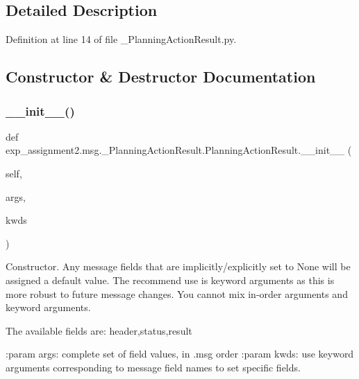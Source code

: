 \subsection{Detailed Description}


Definition at line 14 of file \+\_\+\+Planning\+Action\+Result.\+py.



\subsection{Constructor \& Destructor Documentation}
\mbox{\label{classexp__assignment2_1_1msg_1_1__PlanningActionResult_1_1PlanningActionResult_acd0704f04bad0ab4c760b161a760005e}} 
\subsubsection{\texorpdfstring{\+\_\+\+\_\+init\+\_\+\+\_\+()}{\_\_init\_\_()}}
{\footnotesize\ttfamily def exp\+\_\+assignment2.\+msg.\+\_\+\+Planning\+Action\+Result.\+Planning\+Action\+Result.\+\_\+\+\_\+init\+\_\+\+\_\+ (\begin{DoxyParamCaption}\item[{}]{self,  }\item[{}]{args,  }\item[{}]{kwds }\end{DoxyParamCaption})}

\begin{DoxyVerb}Constructor. Any message fields that are implicitly/explicitly
set to None will be assigned a default value. The recommend
use is keyword arguments as this is more robust to future message
changes.  You cannot mix in-order arguments and keyword arguments.

The available fields are:
   header,status,result

:param args: complete set of field values, in .msg order
:param kwds: use keyword arguments corresponding to message field names
to set specific fields.
\end{DoxyVerb}
 

